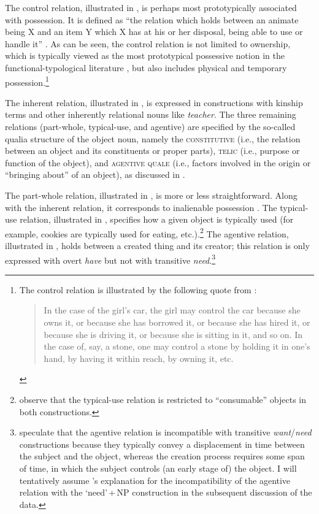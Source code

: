 \documentclass[output=paper]{langscibook}
\begin{document}
The control relation, illustrated in , is perhaps most prototypically associated with possession. It is defined as ``\label{ViknerJensen-control}the relation which holds between an animate being X and an item Y which X has at his or her disposal, being able to use or handle it'' \citep[196--197]{Vikner.Jensen2002}. As can be seen, the control relation is not limited to ownership, which is typically viewed as the most prototypical possessive notion in the functional-typological literature \citep[see, e.g.,][]{Heine1997}, but also includes physical and temporary possession.\footnote{The control relation is illustrated by the following quote from \citeauthor{Vikner.Jensen2002}:
\begin{quote}In the case of the girl's car, the girl may control the car because she owns it, or because she has borrowed it, or because she has hired it, or because she is driving it, or because she is sitting in it, and so on. In the case of, say, a stone, one may control a stone by holding it in one's hand, by having it within reach, by owning it, etc. \hfill  \citep[196--197]{Vikner.Jensen2002}
\end{quote}}

The inherent relation, illustrated in , is expressed in constructions with kinship terms and other inherently relational nouns like \textit{teacher}. The three remaining relations (part-whole, typical-use, and agentive) are specified by the so-called qualia structure of the object noun, namely the \textsc{constitutive} (i.e., the relation between an object and its constituents or proper parts), \textsc{telic} (i.e., purpose or function of the object), and \textsc{agentive quale} (i.e., factors involved in the origin or ``bringing about'' of an object), as discussed in \citet{Pustejovsky1995}.

The part-whole relation, illustrated in , is more or less straightforward. Along with the inherent relation, it corresponds to inalienable possession \citep[see][]{Heine1997}. The typical-use relation, illustrated in , specifies how a given object is typically used (for example, cookies are typically used for eating, etc.).\footnote{\citet{Zaroukian.Beller2013} observe that the typical-use relation is restricted to ``consumable'' objects in both constructions.\label{footnote-cosummable}} The agentive relation, illustrated in , holds between a created thing and its creator; this relation is only expressed with overt \textit{have} but not with transitive \emph{need}.\footnote{\citet{Zaroukian.Beller2013} speculate that the agentive relation is incompatible with transitive \textit{want}/\textit{need} constructions because they typically convey a displacement in time between the subject and the object, whereas the creation process requires some span of time, in which the subject controls (an early stage of) the object. I will tentatively assume \citeauthor{Zaroukian.Beller2013}'s explanation for the incompatibility of the agentive relation with the `need'\,+\,NP construction in the subsequent discussion of the  data.\label{footnote-agentive}}
\end{document}
